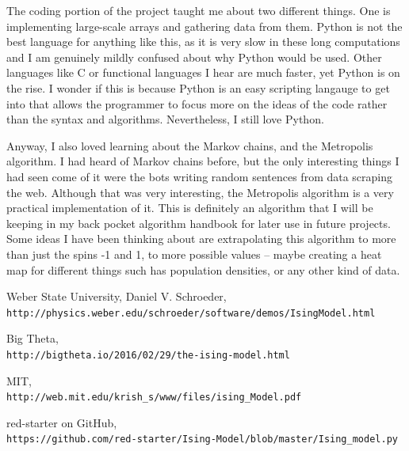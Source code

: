 \documentclass[12pt]{article}
\begin{document}
The coding portion of the project taught me about two different things. One is implementing large-scale arrays and gathering data from them. Python is not the best language for anything like this, as it is very slow in these long computations and I am genuinely mildly confused about why Python would be used. Other languages like C or functional languages I hear are much faster, yet Python is on the rise. I wonder if this is because Python is an easy scripting langauge to get into that allows the programmer to focus more on the ideas of the code rather than the syntax and algorithms. Nevertheless, I still love Python.


Anyway, I also loved learning about the Markov chains, and the Metropolis algorithm. I had heard of Markov chains before, but the only interesting things I had seen come of it were the bots writing random sentences from data scraping the web. Although that was very interesting, the Metropolis algorithm is a very practical implementation of it. This is definitely an algorithm that I will be keeping in my back pocket algorithm handbook for later use in future projects. Some ideas I have been thinking about are extrapolating this algorithm to more than just the spins -1 and 1, to more possible values -- maybe creating a heat map for different things such has population densities, or any other kind of data.



\begin{thebibliography}{9}

 Weber State University, Daniel V. Schroeder,
\\\texttt{http://physics.weber.edu/schroeder/software/demos/IsingModel.html}

 Big Theta,
\\\texttt{http://bigtheta.io/2016/02/29/the-ising-model.html}

 MIT,
\\\texttt{http://web.mit.edu/krish\_s/www/files/ising\_Model.pdf}

red-starter on GitHub, 
\\\texttt{https://github.com/red-starter/Ising-Model/blob/master/Ising\_model.py}



\end{thebibliography}
\end{document}
